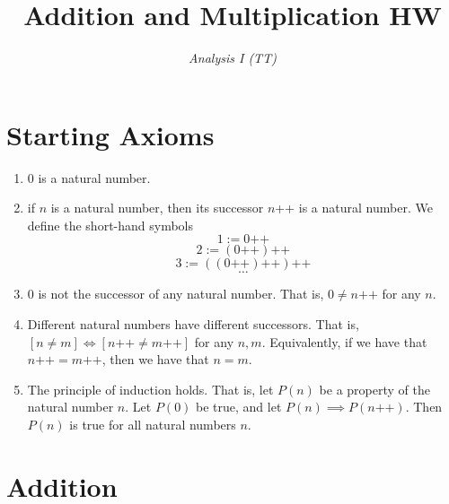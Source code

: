 \documentclass[12pt]{article}
\title{\vspace{-1cm}\textbf{Addition and Multiplication HW}}
\author{\textit{Analysis I (TT)}}
\begin{document}
\maketitle
\vspace{-1em}

\newenvironment{justifiedproof}{%
  \begin{tabular}{@{}p{0.6\linewidth}@{\quad}p{0.12\linewidth}@{}}%
}{\end{tabular}}

\section{Starting Axioms}
\begin{enumerate}
	\item $0$ is a natural number.
	\item if $n$ is a natural number, then its successor $n$++ is a natural number. We define the short-hand symbols
	$$1 := 0\text{++}$$
	$$2 := (0\text{++})\text{++}$$
	$$3 := ((0\text{++})\text{++})\text{++}$$
	$$\hdots$$
	\item $0$ is not the successor of any natural number. That is, $0 \neq n\text{++}$ for any $n$.
	\item Different natural numbers have different successors. That is, $[n \neq m] \iff [n\text{++} \neq m\text{++}]$ for any $n,m$. Equivalently, if we have that $n\text{++} = m\text{++}$, then we have that $n=m$.
	\item The principle of induction holds. That is, let $P(n)$ be a property of the natural number $n$. Let $P(0)$ be true, and let $P(n) \implies P(n\text{++})$. Then $P(n)$ is true for all natural numbers $n$.
 \end{enumerate}


\section{Addition}
\end{document}
